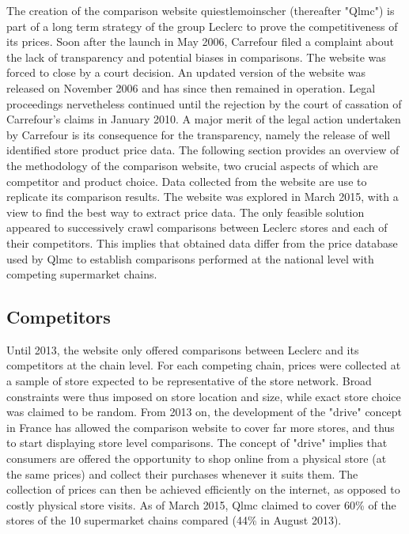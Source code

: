 \documentclass[english]{article}
\begin{document}
The creation of the comparison website quiestlemoinscher (thereafter "Qlmc") is part of a long term strategy of the group Leclerc to prove the competitiveness of its prices. Soon after the launch in May 2006, Carrefour filed a complaint about the lack of transparency and potential biases in comparisons. The website was forced to close by a court decision. An updated version of the website was released on November 2006 and has since then remained in operation. Legal proceedings nervetheless continued until the rejection by the court of cassation of Carrefour's claims in January 2010. A major merit of the legal action undertaken by Carrefour is its consequence for the transparency, namely the release of well identified store product price data. The following section provides an overview of the methodology of the comparison website, two crucial aspects of which are competitor and product choice. Data collected from the website are use to replicate its comparison results. The website was explored in March 2015, with a view to find the best way to extract price data. The only feasible solution appeared to successively crawl comparisons between Leclerc stores and each of their competitors. This implies that obtained data differ from the price database used by Qlmc to establish comparisons performed at the national level with competing supermarket chains.

\subsection{Competitors}

Until 2013, the website only offered comparisons between Leclerc and its competitors at the chain level. For each competing chain, prices were collected at a sample of store expected to be representative of the store network. Broad constraints were thus imposed on store location and size, while exact store choice was claimed to be random. From 2013 on, the development of the "drive" concept in France has allowed the comparison website to cover far more stores, and thus to start displaying store level comparisons. The concept of "drive" implies that consumers are offered the opportunity to shop online from a physical store (at the same prices) and collect their purchases whenever it suits them. The collection of prices can then be achieved efficiently on the internet, as opposed to costly physical store visits. As of March 2015, Qlmc claimed to cover 60\% of the stores of the 10 supermarket chains compared (44\% in August 2013).
\end{document}
